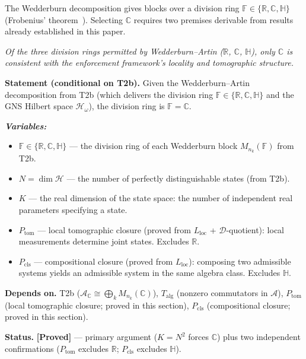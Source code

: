 \documentclass[11pt]{article}
\theoremstyle{remark}
\newenvironment{varlist}{\begin{itemize}[nosep,leftmargin=2em]}{\end{itemize}}
\begin{document}
The Wedderburn decomposition gives blocks over a division ring $\mathbb{F} \in
\{\mathbb{R}, \mathbb{C}, \mathbb{H}\}$ (Frobenius' theorem~\cite{Frobenius1878}).
Selecting $\mathbb{C}$ requires two premises derivable from results already
established in this paper.

\begin{tcolorbox}[apfbox, title={T2c: Selection of the Complex Branch}]
\textit{Of the three division rings permitted by Wedderburn--Artin ($\mathbb{R}$, $\mathbb{C}$, $\mathbb{H}$), only $\mathbb{C}$ is consistent with the enforcement framework's locality and tomographic structure.}

\smallskip\noindent\textbf{Statement (conditional on T2b).}  Given the Wedderburn--Artin decomposition from T2b (which delivers the division ring $\mathbb{F} \in \{\mathbb{R}, \mathbb{C}, \mathbb{H}\}$ and the GNS Hilbert space $\mathcal{H}_\omega$), the division ring is $\mathbb{F} = \mathbb{C}$.

\smallskip\noindent\textbf{\textit{Variables:}}
\begin{varlist}
\item $\mathbb{F} \in \{\mathbb{R}, \mathbb{C}, \mathbb{H}\}$ --- the division ring of each Wedderburn block $M_{n_k}(\mathbb{F})$ from T2b.
\item $N = \dim \mathcal{H}$ --- the number of perfectly distinguishable states (from T2b).
\item $K$ --- the real dimension of the state space: the number of independent real parameters specifying a state.
\item $P_{\mathrm{tom}}$ --- local tomographic closure (proved from $L_{\mathrm{loc}}$ + $\mathcal{D}$-quotient): local measurements determine joint states.  Excludes $\mathbb{R}$.
\item $P_{\mathrm{cls}}$ --- compositional closure (proved from $L_{\mathrm{loc}}$): composing two admissible systems yields an admissible system in the same algebra class.  Excludes $\mathbb{H}$.
\end{varlist}

\smallskip\noindent\textbf{Depends on.}  T2b ($\mathcal{A}_\mathbb{C} \cong \bigoplus_k M_{n_k}(\mathbb{C})$), $T_{\mathrm{alg}}$ (nonzero commutators in $\mathcal{A}$), $P_{\mathrm{tom}}$ (local tomographic closure; proved in this section), $P_{\mathrm{cls}}$ (compositional closure; proved in this section).

\smallskip\noindent\textbf{Status.}  \textbf{[Proved]} --- primary argument ($K = N^2$ forces $\mathbb{C}$) plus two independent confirmations ($P_{\mathrm{tom}}$ excludes $\mathbb{R}$; $P_{\mathrm{cls}}$ excludes $\mathbb{H}$).


\end{tcolorbox}
\end{document}
